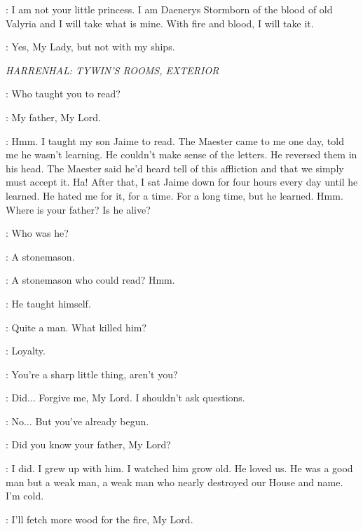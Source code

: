 \DAENERYS: I am not your little princess. I am Daenerys Stormborn of the blood of old Valyria and I will take what is mine. With fire and blood, I will take it. 

\SPICEKING:  Yes, My Lady, but not with my ships. 


\scene

\textit{HARRENHAL: TYWIN'S ROOMS, EXTERIOR} 


\TYWIN: Who taught you to read? 

\ARYA: My father, My Lord. 

\TYWIN: Hmm. I taught my son Jaime to read. The Maester came to me one day, told me he wasn't learning. He couldn't make sense of the letters. He reversed them in his head. The Maester said he'd heard tell of this affliction and that we simply must accept it. Ha! After that, I sat Jaime down for four hours every day until he learned. He hated me for it, for a time. For a long time, but he learned. Hmm. Where is your father? Is he alive? 


\TYWIN: Who was he? 

\ARYA: A stonemason. 

\TYWIN: A stonemason who could read? Hmm. 

\ARYA: He taught himself. 

\TYWIN: Quite a man. What killed him? 

\ARYA: Loyalty. 

\TYWIN: You're a sharp little thing, aren't you? 

\ARYA: Did$\ldots$ Forgive me, My Lord. I shouldn't ask questions. 

\TYWIN: No$\ldots$ But you've already begun. 

\ARYA: Did you know your father, My Lord? 

\TYWIN: I did. I grew up with him. I watched him grow old. He loved us. He was a good man  but a weak man, a weak man who nearly destroyed our House and name. I'm cold. 

\ARYA: I'll fetch more wood for the fire, My Lord. 


